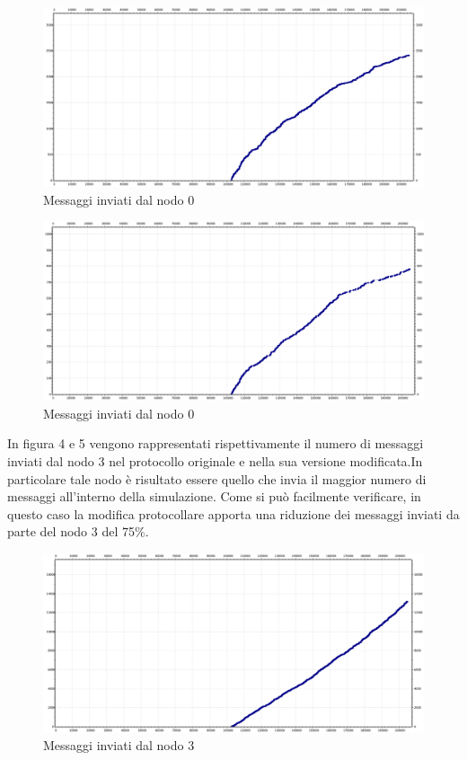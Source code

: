 \documentclass[	
	DIV=calc,
	paper=a4,
	fontsize=11pt,
	onecolumn
]{scrartcl} %
\begin{document}
\begin{figure}
	\centering
	\includegraphics[scale=0.35]{TwoThousandNodesNode0.png}
	\caption{Messaggi inviati dal nodo 0}
	\label{Figura 2}
\end{figure}
\begin{figure}
	\centering
	\includegraphics[scale=0.35]{TwoThousandNodesNode0Mod.png}
	\caption{Messaggi inviati dal nodo 0}
	\label{Figura 3}
\end{figure}

In figura 4 e 5 vengono rappresentati rispettivamente il numero di messaggi inviati dal nodo 3 nel protocollo originale e nella sua versione modificata.In particolare tale nodo è risultato essere quello che invia il maggior numero di messaggi all'interno della simulazione. Come si può facilmente verificare, in questo caso la modifica protocollare apporta una riduzione dei messaggi inviati da parte del nodo 3 del 75\%. 

\begin{figure}
	\centering
	\includegraphics[scale=0.35]{TwoThousandNodesNode3.png}
	\caption{Messaggi inviati dal nodo 3}
	\label{Figura 4}
\end{figure}
\end{document}
